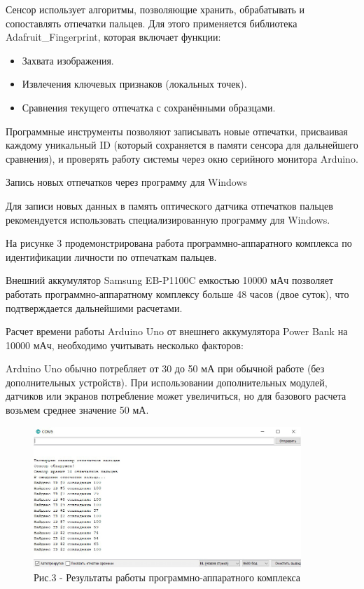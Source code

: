 \begin{multicols}{2}
Сенсор использует алгоритмы, позволяющие хранить, обрабатывать и
сопоставлять отпечатки пальцев. Для этого применяется библиотека
Adafruit\_Fingerprint, которая включает функции:

\begin{itemize}
\item
  Захвата изображения.
\item
  Извлечения ключевых признаков (локальных точек).
\item
  Сравнения текущего отпечатка с сохранёнными образцами.
\end{itemize}

Программные инструменты позволяют записывать новые отпечатки, присваивая
каждому уникальный ID (который сохраняется в памяти сенсора для
дальнейшего сравнения), и проверять работу системы через окно серийного
монитора Arduino.

Запись новых отпечатков через программу для Windows

Для записи новых данных в память оптического датчика отпечатков пальцев
рекомендуется использовать специализированную программу для Windows.

На рисунке 3 продемонстрирована работа программно-аппаратного комплекса
по идентификации личности по отпечаткам пальцев.

Внешний аккумулятор Samsung EB-P1100C емкостью 10000 мАч позволяет
работать программно-аппаратному комплексу больше 48 часов (двое суток),
что подтверждается дальнейшими расчетами.

Расчет времени работы Arduino Uno от внешнего аккумулятора Power Bank на
10000 мАч, необходимо учитывать несколько факторов:

Arduino Uno обычно потребляет от 30 до 50 мА при обычной работе (без
дополнительных устройств). При использовании дополнительных модулей,
датчиков или экранов потребление может увеличиться, но для базового
расчета возьмем среднее значение 50 мА.
\end{multicols}

\begin{figure}[H]
	\centering
	\includegraphics[width=0.9\textwidth]{media/ict/image3}
	\caption*{Рис.3 - Результаты работы программно-аппаратного комплекса}
\end{figure}

